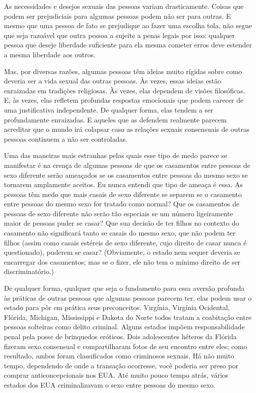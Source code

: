 As necessidades e desejos sexuais das pessoas variam drasticamente. Coisas que podem ser prejudiciais para algumas pessoas podem não ser para outras. E mesmo que uma pessoa de fato se prejudique ao fazer uma escolha tola, não segue que seja razoável que outra pessoa a sujeite a penas legais por isso: qualquer pessoa que deseje liberdade suficiente para ela mesma cometer erros deve estender a mesma liberdade aos outros.

Mas, por diversas razões, algumas pessoas têm ideias muito rígidas sobre como deveria ser a vida sexual das outras pessoas. Às vezes, essas ideias estão enraizadas em tradições religiosas. Às vezes, elas dependem de visões filosóficas. E, às vezes, elas refletem profundas respostas emocionais que podem carecer de uma justificativa independente. De qualquer forma, elas tendem a ser profundamente enraizadas. E aqueles que as defendem realmente parecem acreditar que o mundo irá colapsar caso as relações sexuais consensuais de outras pessoas continuem a não ser controladas.

Uma das maneiras mais estranhas pelas quais esse tipo de medo parece se manifestar é na crença de algumas pessoas de que os casamentos entre pessoas de sexo diferente serão ameaçados se os casamentos entre pessoas do mesmo sexo se tornarem amplamente aceitos. Eu nunca entendi que tipo de ameaça é essa. As pessoas têm medo que mais casais de sexo diferente se separem se o casamento entre pessoas do mesmo sexo for tratado como normal? Que os casamentos de pessoas de sexo diferente não serão tão especiais se um número ligeiramente maior de pessoas puder se casar? Que sua decisão de ter filhos no contexto do casamento não significará tanto se casais do mesmo sexo, que não podem ter filhos (assim como casais estéreis de sexo diferente, cujo direito de casar nunca é questionado), puderem se casar? (Obviamente, o estado nem sequer deveria se encarregar dos casamentos; mas se o fizer, ele não tem o mínimo direito de ser discriminatório.)

De qualquer forma, qualquer que seja o fundamento para essa aversão profunda às práticas de outras pessoas que algumas pessoas parecem ter, elas podem usar o estado para pôr em prática seus preconceitos. Virgínia, Virgínia Ocidental, Flórida, Michigan, Mississippi e Dakota do Norte todos tratam a coabitação entre pessoas solteiras como delito criminal. Alguns estados impõem responsabilidade penal pela posse de brinquedos eróticos. Dois adolescentes héteros da Flórida fizeram sexo consensual e compartilharam fotos de seu encontro entre eles; como resultado, ambos foram classificados como criminosos sexuais. Há não muito tempo, dependendo de onde a transação ocorresse, você poderia ser preso por comprar anticoncepcionais nos EUA. Até muito pouco tempo atrás, vários estados dos EUA criminalizavam o sexo entre pessoas do mesmo sexo.

